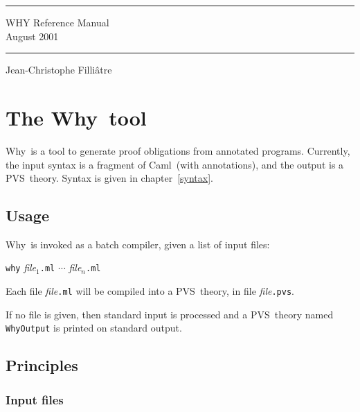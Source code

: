 \documentclass[12pt]{report}
\newcommand{\caml}{\textsf{Caml}}
\newcommand{\pvs}{\textsf{PVS}}
\newcommand{\why}{\textsf{Why}}
\begin{document}
\thispagestyle{empty}
\begin{center}
\vfill
\rule\textwidth{0.1cm}\\[0.3cm]
{\Huge\sf WHY Reference Manual}\\[0.5cm]
{\large August 2001}\\
\rule\textwidth{0.1cm}
\vfill
\noindent Jean-Christophe Filli\^atre
\vfill
\end{center}

\tableofcontents

\chapter{The \why\ tool}

\why\ is a tool to generate proof obligations from annotated programs.
Currently, the input syntax is a fragment of \caml\ (with annotations),
and the output is a \pvs\ theory. Syntax is given in chapter~\ref{syntax}.


\section{Usage}

\why\ is invoked as a batch compiler, given a list of input files:
\begin{center}
  \texttt{why} \textit{file}$_1$\texttt{.ml} $\cdots$
    \textit{file}$_n$\texttt{.ml}
\end{center}
Each file \textit{file}\texttt{.ml} will be compiled into a \pvs\ theory,
in file \textit{file}\texttt{.pvs}.

If no file is given, then standard input is processed and a \pvs\ theory
named \texttt{WhyOutput} is printed on standard output.


\section{Principles}

\subsection{Input files}
\end{document}
